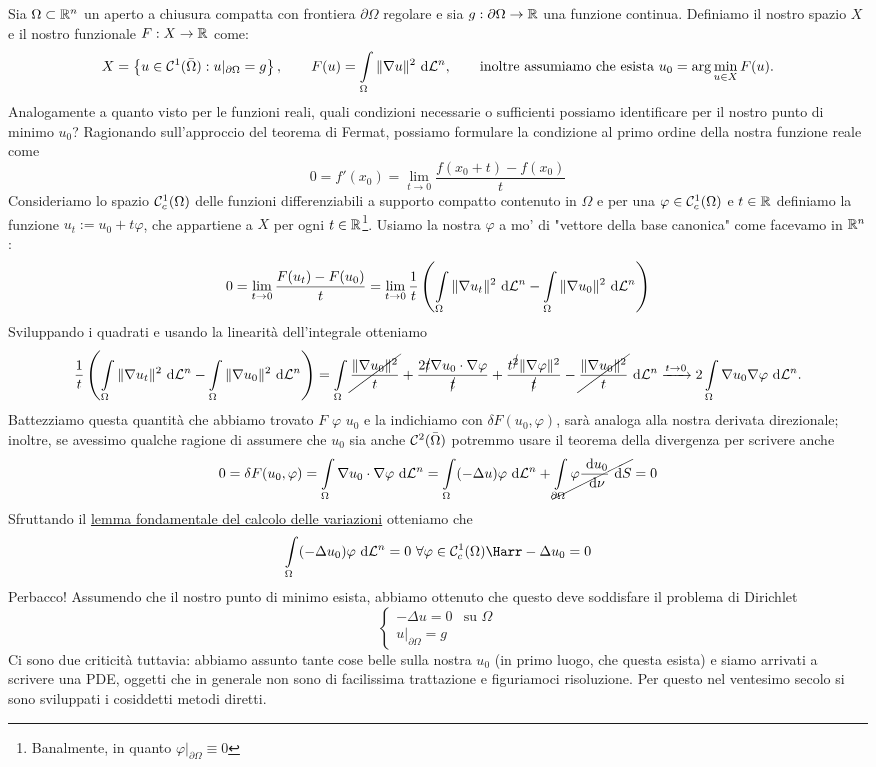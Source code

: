 \documentclass[openany]{book}
\begin{document}
Sia $\Omega\subset\mathbb{R}^n$ un aperto a chiusura compatta con frontiera $\partial\Omega$ regolare e sia $g : \partial\Omega\to\mathbb{R}$ una funzione continua. Definiamo il nostro spazio $X$ e il nostro funzionale $F : X\to\mathbb{R}$ come:
\[ X = \left\{ u \in \mc{C}^1(\bar{\Omega}) : u|_{\partial\Omega} = g \right\}, \qquad F(u) = \intop_\Omega \|\nabla u\|^2 \de \L^n, \qquad\text{inoltre assumiamo che esista } u_0 = \arg\min_{u \in X} F(u). \]
Analogamente a quanto visto per le funzioni reali, quali condizioni necessarie o sufficienti possiamo identificare per il nostro punto di minimo $u_0$? Ragionando sull'approccio del teorema di Fermat, possiamo formulare la condizione al primo ordine della nostra funzione reale come 
\[ 0 = f'(x_0) = \lim_{t\to 0} \frac{f(x_0+t) - f(x_0)}{t} \]
Consideriamo lo spazio $\mathcal{C}^1_c(\Omega)$ delle funzioni differenziabili a supporto compatto contenuto in $\Omega$ e per una $\varphi \in \mathcal{C}^1_c(\Omega)$ e $t \in \mathbb{R}$ definiamo la funzione $u_t := u_0 + t\varphi$, che appartiene a $X$ per ogni $t \in \mathbb{R}$\footnote{Banalmente, in quanto $\varphi|_{\partial\Omega} \equiv 0$}. Usiamo la nostra $\varphi$ a mo' di "vettore della base canonica" come facevamo in $\mathbb{R}^n$:
\[0 = \lim_{t\to 0} \frac{F(u_t) - F(u_0)}{t} = \lim_{t\to 0} \frac{1}{t} \left( \intop_\Omega \|\nabla u_t\|^2 \de \L^n - \intop_\Omega \|\nabla u_0\|^2 \de \L^n \right)\]
Sviluppando i quadrati e usando la linearità dell'integrale otteniamo
\[ \frac{1}{t} \left( \intop_\Omega \|\nabla u_t\|^2 \de \L^n - \intop_\Omega \|\nabla u_0\|^2 \de \L^n \right) =  \intop_\Omega \cancel{\frac{\|\nabla u_0\|^2}{t}} + \frac{2\cancel{t} \nabla u_0 \cdot \nabla \varphi}{\cancel{t}} + \frac{t^{\cancel{2}}\|\nabla \varphi\|^2}{\cancel{t}} -\cancel{\frac{\|\nabla u_0\|^2}{t}} \de \L^n \xrightarrow{t \to 0} 2\intop_\Omega \nabla u_0 \nabla \varphi \de\L^n.\]
Battezziamo questa quantità che abbiamo trovato  $F$  $\varphi$  $u_0$ e la indichiamo con $\delta F(u_0,\varphi)$, sarà analoga alla nostra derivata direzionale; inoltre, se avessimo qualche ragione di assumere che $u_0$ sia anche $\mathcal{C}^2(\bar{\Omega})$ potremmo usare il teorema della divergenza per scrivere anche
\[ 0 = \delta F(u_0,\varphi) = \intop_{\Omega} \nabla u_0 \cdot \nabla\varphi \de\L^n = \intop_{\Omega}(-\Delta u)\varphi \de\L^n + \cancel{\intop_{\partial\Omega} \varphi \frac{\de u_0}{\de \nu} \de S } = 0\]
Sfruttando il \href{lemma fondamentale cdv}{lemma fondamentale del calcolo delle variazioni} otteniamo che
\[ \intop_{\Omega} (-\Delta u_0) \varphi \de\L^n = 0\ \forall \varphi \in \mc{C}^1_c(\Omega)  \Harr -\Delta u_0 = 0 \]
Perbacco! Assumendo che il nostro punto di minimo esista, abbiamo ottenuto che questo deve soddisfare il problema di Dirichlet
\[ \begin{cases} -\Delta u = 0 & \text{su }\Omega \\ u|_{\partial\Omega} = g \end{cases}\]
Ci sono due criticità tuttavia: abbiamo assunto tante cose belle sulla nostra $u_0$ (in primo luogo, che questa esista) e siamo arrivati a scrivere una PDE, oggetti che in generale non sono di facilissima trattazione e figuriamoci risoluzione. Per questo nel ventesimo secolo si sono sviluppati i cosiddetti metodi diretti.
\end{document}
